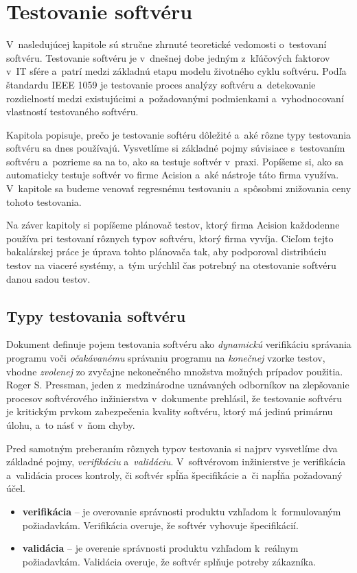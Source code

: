 %
%
\chapter{Testovanie softvéru}
\label{kapitola:testovanie_softveru}
V~nasledujúcej kapitole sú stručne zhrnuté teoretické vedomosti 
o~testovaní softvéru. 
Testovanie softvéru je v~dnešnej dobe jedným z~kľúčových faktorov v~IT 
sfére a~patrí medzi základnú etapu modelu životného cyklu softvéru.
Podľa štandardu IEEE 1059 \cite{Ieee} je testovanie proces analýzy 
softvéru a~detekovanie rozdielností medzi existujúcimi a~požadovanými 
podmienkami a~vyhodnocovaní vlastností testovaného softvéru. 

Kapitola popisuje, prečo je testovanie softéru 
dôležité a~aké rôzne typy testovania softvéru sa dnes používajú. 
Vysvetlíme si základné pojmy súvisiace s~testovaním softvéru a~pozrieme
sa na to, ako sa testuje softvér v~praxi.
Popíšeme si, ako sa automaticky testuje softvér vo firme Acision
a~aké nástroje táto firma využíva. 
V~kapitole sa budeme venovať regresnému testovaniu a~spôsobmi znižovania
ceny tohoto testovania. 

Na záver kapitoly si popíšeme plánovač testov, ktorý firma Acision 
každodenne používa pri testovaní rôznych typov softvéru, ktorý firma vyvíja. 
Cieľom tejto bakalárskej práce je úprava tohto plánovača tak, aby 
podporoval distribúciu testov na viaceré systémy, a~tým urýchlil čas 
potrebný na otestovanie softvéru danou sadou testov. 

\section{Typy testovania softvéru} 
\label{sekcia:typy_testovania}
Dokument \cite{Swebok} definuje pojem testovania softvéru ako 
\emph{dynamickú} verifikáciu správania programu voči \emph{očakávanému} 
správaniu programu na \emph{konečnej} vzorke testov, vhodne \emph{zvolenej} 
zo zvyčajne nekonečného množstva možných prípadov použitia.
Roger S. Pressman, jeden z~medzinárodne uznávaných odborníkov na 
zlepšovanie procesov softvérového inžinierstva v~dokumente 
\cite{Pressman} prehlásil, že testovanie softvéru je kritickým prvkom 
zabezpečenia kvality softvéru, ktorý má jedinú primárnu úlohu, 
a~to násť v~ňom chyby.  

Pred samotným preberaním rôznych typov testovania si najprv vysvetlíme
dva základné pojmy, \emph{verifikáciu} a~\emph{validáciu}. 
V~softvérovom inžinierstve je verifikácia a~validácia proces kontroly, či
softvér spĺňa špecifikácie a~či napĺňa požadovaný účel.
\begin{itemize}
\item \textbf{verifikácia} -- je overovanie správnosti produktu vzhľadom
k~formulovaným požiadavkám. Verifikácia overuje, že softvér vyhovuje 
špecifikácií.
\item \textbf{validácia} -- je overenie správnosti produktu vzhľadom
k~reálnym požiadavkám. Validácia overuje, že softvér splňuje potreby
zákazníka.
\end{itemize}

